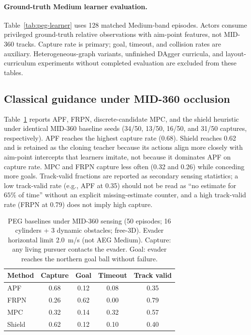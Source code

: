 \documentclass{SCIS2026}
\begin{document}
\paragraph{Ground-truth Medium learner evaluation.}
Table~\ref{tab:peg-learner} uses 128 matched Medium-band episodes. Actors consume privileged ground-truth relative observations with aim-point features, not MID-360 tracks. Capture rate is primary; goal, timeout, and collision rates are auxiliary. Heterogeneous-graph variants, unfinished DAgger curricula, and layout-curriculum experiments without completed evaluation are excluded from these tables.

\subsection{Classical guidance under MID-360 occlusion}
Table~\ref{tab:peg-baselines} reports APF, FRPN, discrete-candidate MPC, and the shield heuristic under identical MID-360 baseline seeds (34/50, 13/50, 16/50, and 31/50 captures, respectively). APF reaches the highest capture rate (0.68). Shield reaches 0.62 and is retained as the cloning teacher because its actions align more closely with aim-point intercepts that learners imitate, not because it dominates APF on capture rate. MPC and FRPN capture less often (0.32 and 0.26) while conceding more goals. Track-valid fractions are reported as secondary sensing statistics; a low track-valid rate (e.g., APF at 0.35) should not be read as ``no estimate for $65\%$ of time'' without an explicit missing-estimate counter, and a high track-valid rate (FRPN at 0.79) does not imply high capture.

\begin{table}[H]
\footnotesize
\caption{PEG baselines under MID-360 sensing (50 episodes; 16 cylinders + 3 dynamic obstacles; free-3D). Evader horizontal limit $2.0$~m/s (not AEG Medium). Capture: any living pursuer contacts the evader. Goal: evader reaches the northern goal ball without failure.}
\label{tab:peg-baselines}
\begin{tabularx}{\textwidth}{Xcccc}
\toprule
Method & Capture & Goal & Timeout & Track valid \\\hline
APF & 0.68 & 0.12 & 0.08 & 0.35 \\
FRPN & 0.26 & 0.62 & 0.00 & 0.79 \\
MPC & 0.32 & 0.14 & 0.32 & 0.57 \\
Shield & 0.62 & 0.12 & 0.10 & 0.40 \\
\bottomrule
\end{tabularx}
\end{table}
\end{document}
